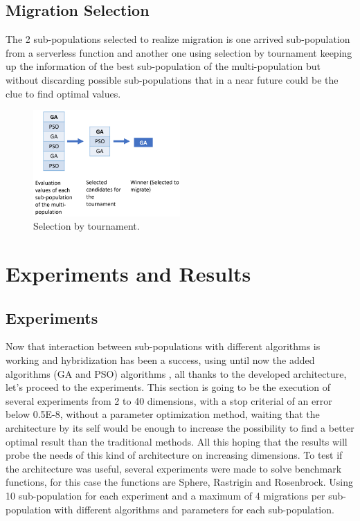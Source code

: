 \documentclass[runningheads]{llncs}
\begin{document}
  \subsection{Migration Selection} The 2 sub-populations selected to realize
  migration is one arrived sub-population from a serverless function and another
  one using selection by tournament keeping up the information of the best
  sub-population of the multi-population but without discarding possible
  sub-populations that in a near future could be the clue to find optimal
  values.

\begin{figure}[htp]
  \centering
  \includegraphics[width=0.5\textwidth]{img/selection.png}
  \caption{Selection by tournament.} \label{fig5}
  \end{figure}


\section{Experiments and Results}
\subsection{Experiments}
Now that interaction between sub-populations with different algorithms is
working and hybridization has been a success, using until now the added
algorithms (GA and PSO) algorithms \cite{Kramer2017,Guerrero2017,Lalwani2019},
all thanks to the developed architecture, let's proceed to the experiments. This
section is going to be the execution of several experiments from 2 to 40
dimensions, with a stop criterial of an error below 0.5E-8, without a parameter
optimization method, waiting that the architecture by its self would be enough
to increase the possibility to find a better optimal result than the traditional
methods. All this hoping that the results will probe the needs of this kind of
architecture on increasing dimensions. To test if the architecture was useful,
several experiments were made to solve benchmark functions, for this case the
functions are Sphere, Rastrigin and Rosenbrock. Using 10 sub-population for each
experiment and a maximum of 4 migrations per sub-population with different
algorithms and parameters for each sub-population.
\end{document}
